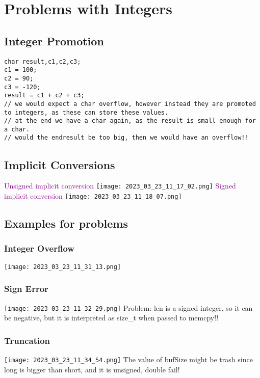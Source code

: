 \documentclass[main.tex,fontsize=8pt,paper=a4,paper=portrait,DIV=calc,]{scrartcl}
\begin{document}
\section{Problems with Integers}

\subsection{Integer Promotion}
\begin{lstlisting}
char result,c1,c2,c3;
c1 = 100;
c2 = 90;
c3 = -120;
result = c1 + c2 + c3;
// we would expect a char overflow, however instead they are promoted to integers, as these can store these values.
// at the end we have a char again, as the result is small enough for a char.
// would the endresult be too big, then we would have an overflow!!
\end{lstlisting}

\subsection{Implicit Conversions}
\textcolor{purple}{Unsigned implicit conversion}\newline
\texttt{[image: 2023\_03\_23\_11\_17\_02.png]}\newline
\textcolor{purple}{Signed implicit conversion}\newline
\texttt{[image: 2023\_03\_23\_11\_18\_07.png]}

\subsection{Examples for problems}

\subsubsection{Integer Overflow}
\texttt{[image: 2023\_03\_23\_11\_31\_13.png]}

\subsubsection{Sign Error}
\texttt{[image: 2023\_03\_23\_11\_32\_29.png]}\newline
Problem: len is a signed integer, so it can be negative, but it is interpreted as size\_t when passed to memcpy!!

\subsubsection{Truncation}
\texttt{[image: 2023\_03\_23\_11\_34\_54.png]}\newline
The value of bufSize might be trash since long is bigger than short, and it is unsigned, double fail!
\end{document}
